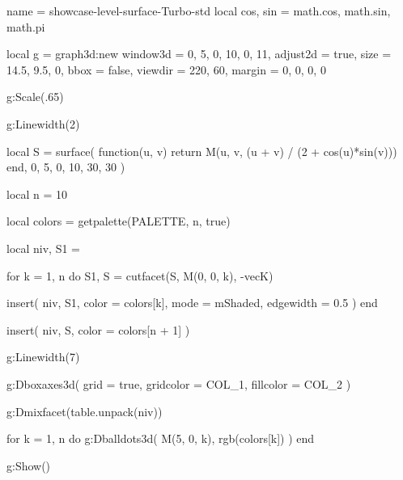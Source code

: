 \documentclass{tutodoc}
\newcommand{\PALETTE}{Turbo}
\begin{document}
\begin{luadraw}{name = showcase-level-surface-\PALETTE-std}
local cos, sin = math.cos, math.sin, math.pi

local g = graph3d:new{
  window3d = {0, 5, 0, 10, 0, 11},
  adjust2d = true,
  size     = {14.5, 9.5, 0},
  bbox     = false,
  viewdir  = {220, 60},
  margin   = {0, 0, 0, 0}
}

g:Scale(.65)

g:Linewidth(2)

local S = surface(
  function(u, v)
    return M(u, v, (u + v) / (2 + cos(u)*sin(v)))
  end,
  0, 5, 0, 10,
  {30, 30}
)

local n = 10

local colors = getpalette(PALETTE, n, true)

local niv, S1 = {}

for k = 1, n do
  S1, S = cutfacet(S, {M(0, 0, k), -vecK})

  insert(
    niv,
    {
      S1,
      {
        color     = colors[k],
        mode      = mShaded,
        edgewidth = 0.5
      }
    }
  )
end

insert(
  niv,
  {
    S,
    {color = colors[n + 1]}
  }
)

g:Linewidth(7)

g:Dboxaxes3d({
  grid      = true,
  gridcolor = COL_1,
  fillcolor = COL_2
})

g:Dmixfacet(table.unpack(niv))

for k = 1, n do
  g:Dballdots3d(
    M(5, 0, k),
    rgb(colors[k])
  )
end

g:Show()
\end{luadraw}



\newpage
\end{document}
